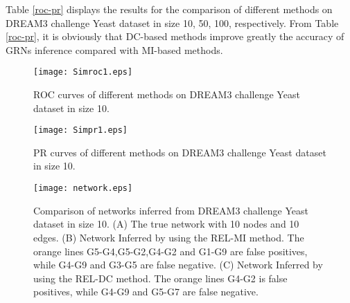 \documentclass{bioinfo}
\begin{document}
 Table \ref{roc-pr} displays the results for the comparison of different methods on DREAM3 challenge Yeast dataset in size 10, 50, 100, respectively. From Table \ref{roc-pr}, it is obviously that DC-based methods improve greatly the accuracy of GRNs inference compared with MI-based methods.

\begin{figure}
  \texttt{[image: Simroc1.eps]}
  \caption{ROC curves of different methods on DREAM3 challenge Yeast dataset in size 10.}\label{roc-curve1}
\end{figure}

\begin{figure}
  \texttt{[image: Simpr1.eps]}
  \caption{ PR curves of different methods on DREAM3 challenge Yeast dataset in size 10.}\label{pr-curve1}
\end{figure}

\begin{figure}[!h]
  \texttt{[image: network.eps]}
  \caption{Comparison of networks inferred from DREAM3 challenge Yeast dataset in size 10. (A) The true network with 10 nodes and 10 edges. (B)
  Network Inferred by using the REL-MI method. The orange lines G5-G4,G5-G2,G4-G2 and G1-G9 are false positives, while G4-G9 and G3-G5 are false
  negative. (C) Network Inferred by using the REL-DC method. The orange lines G4-G2 is false positives, while G4-G9 and G5-G7 are false
  negative. }\label{network}
\end{figure}

%
\end{document}
